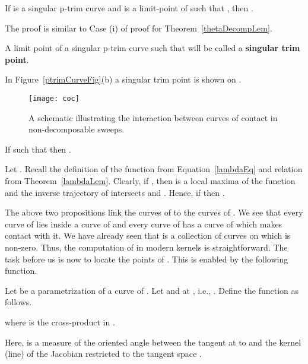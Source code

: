 \documentclass{elsart5p}
\newcommand{\eat}[1]{}
\begin{document}
\begin{prop} \label{singTrimCLem}
If  is a singular p-trim curve and  is a limit-point of
 such that , then .
\end{prop}
The proof is similar to Case (i) of proof for Theorem~\ref{thetaDecompLem}.

\eat{For , let  denote the -coordinate of .  By 
Lemma~\ref{trimCLem} it follows that for each  there exists  
such that .  Since  
and  is free from self-intersections, we have that . 
Hence, for a small neighborhood  of  in ,
assuming  is a smooth curve,  we may parametrize 
 by a map  so that  and 
 for .  
Let .  Then, 


Hence, 

Since , 
the map  fails to be an immersion at  
and by Lemma~\ref{singLem} we conclude that .
\hfill .
}

\begin{defn} \label{singTrimPtDef}
A limit point  of a singular p-trim curve  such that  will be called a 
{\bf singular trim point}.
\end{defn}

In Figure~\ref{ptrimCurveFig}(b) a singular trim point  is shown on .


\begin{figure}
 \centering
  \texttt{[image: coc]}
  \caption{A schematic illustrating the interaction between curves of contact in non-decomposable sweeps.}
 \label{cocFig}
\end{figure}

\begin{prop} \label{thetaNegLem}
If  such that  then .
\end{prop}
Let .
Recall the definition of the function  from Equation~\ref{lambdaEq} and relation 
 from Theorem~\ref{lambdaLem}.  Clearly, if ,  
then  is a local maxima of the function  and the inverse trajectory of  intersects 
 and .  Hence, if  then .
\hfill 

The above two propositions link the curves of  to the curves of .
We see that every curve of  lies inside a curve of  and 
every curve  of  has a curve  of  
which makes contact with it.  We have already seen that  is a collection of curves 
on which  is non-zero.  Thus, the computation of  in modern 
kernels is straightforward. The task before us is now to locate the points of 
. This is enabled by the following function.

\begin{defn}  \label{omegaDef}
Let  be a parametrization of a curve  of .  
Let  and   
at , i.e., .   Define the function 
 as follows.

where  is the cross-product in .
\end{defn}
 Here,  is a measure of the oriented angle between the tangent at  to  
and the kernel  (line) of the Jacobian  restricted to the tangent space .
\end{document}
